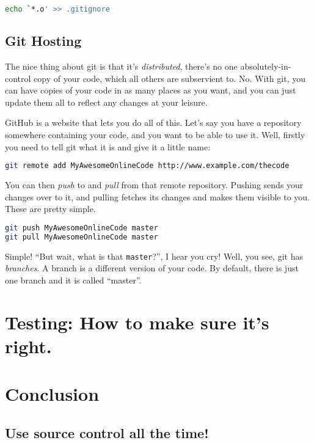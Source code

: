 \documentclass[12pt,a4paper]{article}
\begin{document}
\begin{lstlisting}[language=bash]
echo `*.o' >> .gitignore
\end{lstlisting}

\subsection{Git Hosting}

The nice thing about git is that it's \textit{distributed}, there's no
one absolutely-in-control copy of your code, which all others are
subservient to. No. With git, you can have copies of your code in as
many places as you want, and you can just update them all to reflect
any changes at your leisure.

GitHub is a website that lets you do all of this. Let's say you have a
repository somewhere containing your code, and you want to be able to
use it. Well, firstly you need to tell git what it is and give it a
little name:

\begin{lstlisting}[language=bash]
git remote add MyAwesomeOnlineCode http://www.example.com/thecode
\end{lstlisting}

You can then \textit{push} to and \textit{pull} from that remote
repository. Pushing sends your changes over to it, and pulling fetches
its changes and makes them visible to you. These are pretty simple.

\begin{lstlisting}[language=bash]
git push MyAwesomeOnlineCode master
git pull MyAwesomeOnlineCode master
\end{lstlisting}

Simple! ``But wait, what is that \texttt{master}?'', I hear you cry!
Well, you see, git has \textit{branches}. A branch is a different
version of your code. By default, there is just one branch and it is
called ``master''.

\pagebreak
\section{Testing: How to make sure it's right.}

\pagebreak
\section{Conclusion}

\subsection{Use source control all the time!}
\end{document}
